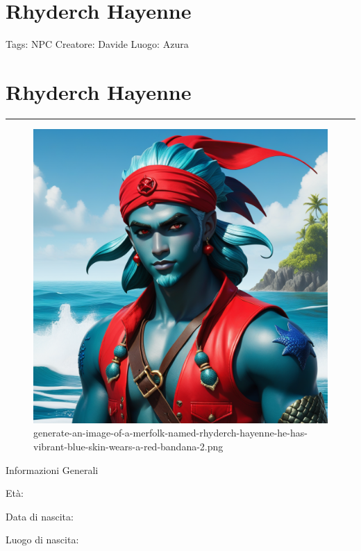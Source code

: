 \section{Rhyderch Hayenne}\label{rhyderch-hayenne}

Tags: NPC Creatore: Davide Luogo: Azura

\section{Rhyderch Hayenne}\label{rhyderch-hayenne-1}

\begin{center}\rule{0.5\linewidth}{0.5pt}\end{center}

\begin{figure}
\centering
\includegraphics{generate-an-image-of-a-merfolk-named-rhyderch-hayenne-he-has-vibrant-blue-skin-wears-a-red-bandana-2.png}
\caption{generate-an-image-of-a-merfolk-named-rhyderch-hayenne-he-has-vibrant-blue-skin-wears-a-red-bandana-2.png}
\end{figure}

Informazioni Generali

Età:

Data di nascita:

Luogo di nascita:

